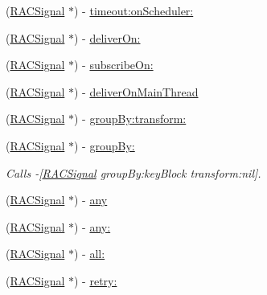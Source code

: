 \begin{DoxyCompactItemize}
\item 
(\mbox{\hyperlink{interface_r_a_c_signal}{R\+A\+C\+Signal}} $\ast$) -\/ \mbox{\hyperlink{category_r_a_c_signal_07_operations_08_a8c5f03f4cc8a132e91a985f3d5ccebc0}{timeout\+:on\+Scheduler\+:}}
\item 
(\mbox{\hyperlink{interface_r_a_c_signal}{R\+A\+C\+Signal}} $\ast$) -\/ \mbox{\hyperlink{category_r_a_c_signal_07_operations_08_a69e4dc1c476da42ed829caed84fbd258}{deliver\+On\+:}}
\item 
(\mbox{\hyperlink{interface_r_a_c_signal}{R\+A\+C\+Signal}} $\ast$) -\/ \mbox{\hyperlink{category_r_a_c_signal_07_operations_08_a6b8db542f7106880577a943cb8e9da90}{subscribe\+On\+:}}
\item 
(\mbox{\hyperlink{interface_r_a_c_signal}{R\+A\+C\+Signal}} $\ast$) -\/ \mbox{\hyperlink{category_r_a_c_signal_07_operations_08_a0c7042ce0eb6c729bc38421295296db1}{deliver\+On\+Main\+Thread}}
\item 
(\mbox{\hyperlink{interface_r_a_c_signal}{R\+A\+C\+Signal}} $\ast$) -\/ \mbox{\hyperlink{category_r_a_c_signal_07_operations_08_ad04cf174e24905df96f211b60e31a3cd}{group\+By\+:transform\+:}}
\item 
\mbox{\label{category_r_a_c_signal_07_operations_08_a35f9a656ad047d90f6997aee136782e5}} 
(\mbox{\hyperlink{interface_r_a_c_signal}{R\+A\+C\+Signal}} $\ast$) -\/ \mbox{\hyperlink{category_r_a_c_signal_07_operations_08_a35f9a656ad047d90f6997aee136782e5}{group\+By\+:}}
\begin{DoxyCompactList}\small\item\em Calls -\/\mbox{[}\mbox{\hyperlink{interface_r_a_c_signal}{R\+A\+C\+Signal}} group\+By\+:key\+Block transform\+:nil\mbox{]}. \end{DoxyCompactList}\item 
(\mbox{\hyperlink{interface_r_a_c_signal}{R\+A\+C\+Signal}} $\ast$) -\/ \mbox{\hyperlink{category_r_a_c_signal_07_operations_08_af64359cf92ab95039f48270a71446e08}{any}}
\item 
(\mbox{\hyperlink{interface_r_a_c_signal}{R\+A\+C\+Signal}} $\ast$) -\/ \mbox{\hyperlink{category_r_a_c_signal_07_operations_08_a4bfb6af6556526457fbf0e5d3c878536}{any\+:}}
\item 
(\mbox{\hyperlink{interface_r_a_c_signal}{R\+A\+C\+Signal}} $\ast$) -\/ \mbox{\hyperlink{category_r_a_c_signal_07_operations_08_adb70e0b813cec0b7bcc5c76f2f3cd88f}{all\+:}}
\item 
(\mbox{\hyperlink{interface_r_a_c_signal}{R\+A\+C\+Signal}} $\ast$) -\/ \mbox{\hyperlink{category_r_a_c_signal_07_operations_08_a3601540c46ceb34dbd1c242782022809}{retry\+:}}

\end{DoxyCompactItemize}
